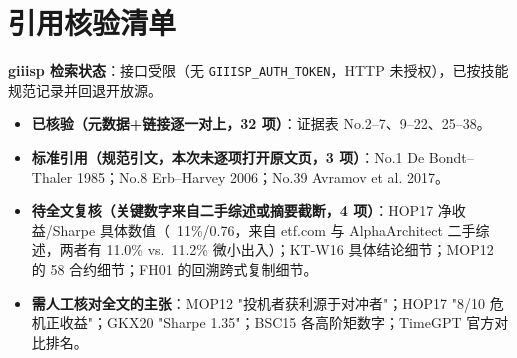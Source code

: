 \documentclass[11pt,a4paper]{article}
\begin{document}
\section{引用核验清单}\label{sec:audit}
\textbf{giiisp 检索状态}：接口受限（无 \texttt{GIIISP\_AUTH\_TOKEN}，HTTP 未授权），已按技能规范记录并回退开放源。

\begin{itemize}
\item \textbf{已核验（元数据+链接逐一对上，32 项）}：证据表 No.2--7、9--22、25--38。
\item \textbf{标准引用（规范引文，本次未逐项打开原文页，3 项）}：No.1 De Bondt--Thaler 1985；No.8 Erb--Harvey 2006；No.39 Avramov et al. 2017。
\item \textbf{待全文复核（关键数字来自二手综述或摘要截断，4 项）}：HOP17 净收益/Sharpe 具体数值（~11\%/0.76，来自 etf.com 与 AlphaArchitect 二手综述，两者有 11.0\% vs.\ 11.2\% 微小出入）；KT-W16 具体结论细节；MOP12 的 58 合约细节；FH01 的回溯跨式复制细节。
\item \textbf{需人工核对全文的主张}：MOP12 "投机者获利源于对冲者"；HOP17 "8/10 危机正收益"；GKX20 "Sharpe 1.35"；BSC15 各高阶矩数字；TimeGPT 官方对比排名。
\end{itemize}
\end{document}
